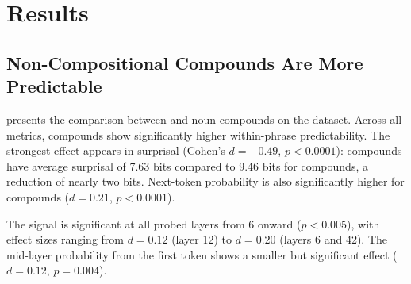 \section{Results}
\label{sec:results}

\subsection{Non-Compositional Compounds Are More Predictable}
\label{sec:results_farahmand}

 presents the comparison between \comp and \noncomp noun compounds on the \farahmand dataset.
Across all metrics, \noncomp compounds show significantly higher within-phrase predictability.
The strongest effect appears in surprisal (Cohen's $d = -0.49$, $p < 0.0001$): \noncomp compounds have average surprisal of 7.63 bits compared to 9.46 bits for \comp compounds, a reduction of nearly two bits.
Next-token probability is also significantly higher for \noncomp compounds ($d = 0.21$, $p < 0.0001$).

The \logitlens signal is significant at all probed layers from 6 onward ($p < 0.005$), with effect sizes ranging from $d = 0.12$ (layer 12) to $d = 0.20$ (layers 6 and 42).
The \futurelens mid-layer probability from the first token shows a smaller but significant effect ($d = 0.12$, $p = 0.004$).

\begin{table}[t]
\centering
\caption{Comparison of prediction metrics between \comp (C, $n = 902$) and \noncomp (NC, $n = 140$) noun compounds on the \farahmand dataset. All $p$-values from two-sided Mann-Whitney $U$ tests. Best effect sizes are \textbf{bolded}.}
\label{tab:farahmand}
\vspace{4pt}
\end{table}

